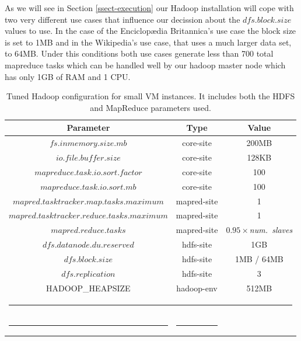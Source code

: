 \documentclass[oribibl]{llncs_Ibergrid2013}
\begin{document}
As we will see in Section \ref{ssect-execution} our Hadoop installation will cope with two very different use cases that influence our decission about the $dfs.block.size$ values to use. In the case of the Enciclop{\ae}dia Britannica's use case the block size is set to 1MB and in the Wikipedia's use case, that uses a much larger data set, to 64MB. Under this conditions both use cases generate less than 700 total mapreduce tasks which can be handled well by our hadoop master node which has only 1GB of RAM and 1 CPU.


\begin{table}[h!]
\caption{Tuned Hadoop configuration for small VM instances. It includes both the HDFS and MapReduce parameters used.}
\label{table:conf}
%
\vspace{-0.5em}
%
\begin{center}
\begin{tabular}{ccc}
\toprule
Parameter				& Type 			& Value	 	\\
\midrule
$fs.inmemory.size.mb$			& core-site		& 200MB	 	\\
$io.file.buffer.size$                  	& core-site		& 128KB  	\\
$mapreduce.task.io.sort.factor$ 	& core-site		& 100	 	\\
$mapreduce.task.io.sort.mb$ 	 	& core-site		& 100	 	\\
$mapred.tasktracker.map.tasks.maximum$ 	& mapred-site		& 1	 	\\
$mapred.tasktracker.reduce.tasks.maximum$ & mapred-site		& 1	 	\\
$mapred.reduce.tasks$ 			& mapred-site		& $0.95\times$\emph{num.~slaves} \\
$dfs.datanode.du.reserved$ 		& hdfs-site		& 1GB	 	\\
$dfs.block.size$ 			& hdfs-site		& 1MB / 64MB 	\\
$dfs.replication$ 			& hdfs-site		& 3	 	\\
HADOOP\_HEAPSIZE            	 	& hadoop-env   		& 512MB 	\\
%
%
\bottomrule
\multicolumn{3}{c}{\rule{0.98\textwidth}{0em}}\\
\rule{0.3\textwidth}{0cm} & \rule{0.2\textwidth}{0cm} &  \\
\end{tabular}
\end{center}
\end{table}
\end{document}
